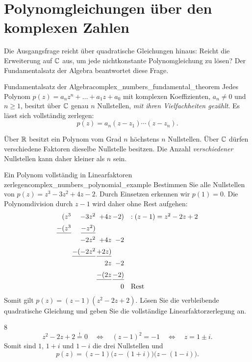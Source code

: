 \section{Polynomgleichungen über den komplexen Zahlen}
\label{sec:complex_numbers_polynomial_equations}
Die Ausgangsfrage reicht über quadratische Gleichungen hinaus: Reicht die
Erweiterung auf $\mathbb{C}$ aus, um jede nichtkonstante Polynomgleichung zu lösen?
Der Fundamentalsatz der Algebra beantwortet diese Frage.

\begin{TheoremBox}{Fundamentalsatz der Algebra}{complex_numbers_fundamental_theorem}
  Jedes Polynom $p(z)=a_nz^n+\dots+a_1z+a_0$ mit komplexen Koeffizienten,
  $a_n\ne0$ und $n\ge1$, besitzt über $\mathbb{C}$ genau $n$ Nullstellen,
  \emph{mit ihren Vielfachheiten gezählt}. Es lässt sich vollständig zerlegen:
  \[
    p(z)=a_n(z-z_1)\cdots(z-z_n).
  \]
\end{TheoremBox}
Über $\mathbb{R}$ besitzt ein Polynom vom Grad $n$ höchstens $n$ Nullstellen.
Über $\mathbb{C}$ dürfen verschiedene Faktoren dieselbe Nullstelle besitzen. Die Anzahl
\emph{verschiedener} Nullstellen kann daher kleiner als $n$ sein.

\begin{ExampleBox}{Ein Polynom vollständig in Linearfaktoren zerlegen}{complex_numbers_polynomial_example}
  Bestimmen Sie alle Nullstellen von $p(z)=z^3-3z^2+4z-2$.
  Durch Einsetzen erkennen wir $p(1)=0$. Die Polynomdivision durch $z-1$
  wird daher ohne Rest aufgehen:
  \[
    \begin{array}{@{}r@{\,}r@{\,}r@{\,}r@{\quad}l@{}}
      (z^3&-3z^2&+4z&-2)&:(z-1)=z^2-2z+2\\[5pt]
      \underline{-(z^3}&\underline{-z^2)}&&&\\[5pt]
      &-2z^2&+4z&-2&\\[5pt]
      &\underline{-(-2z^2}&\underline{+2z)}&&\\[5pt]
      &&2z&-2&\\[5pt]
      &&\underline{-(2z}&\underline{-2)}&\\[5pt]
      &&&0&\text{Rest}
    \end{array}
  \]
  Somit gilt $p(z)=(z-1)(z^2-2z+2)$.
  Lösen Sie die verbleibende quadratische Gleichung und geben Sie die
  vollständige Linearfaktorzerlegung an.
  \begin{ClozeArea}{8}
    \[
      z^2-2z+2\overset{!}{=}0
      \quad\Longleftrightarrow\quad (z-1)^2=-1
      \quad\Longleftrightarrow\quad z=1\pm i.
    \]
    Somit sind $1$, $1+i$ und $1-i$ die drei Nullstellen und
    \[
      p(z)=(z-1)\bigl(z-(1+i)\bigr)\bigl(z-(1-i)\bigr).
    \]
  \end{ClozeArea}
\end{ExampleBox}

